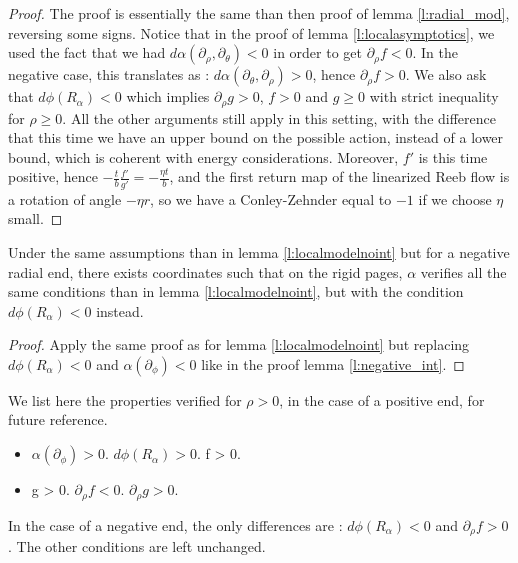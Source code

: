 \documentclass[../main.tex]{subfiles}
\begin{document}
\begin{proof}
The proof is essentially the same than then proof of lemma \ref{l:radial_mod}, reversing some signs. Notice that in the proof of lemma \ref{l:localasymptotics}, we used the fact that we had $d\alpha(\partial_\rho,\partial_\theta)< 0$ in order to get $\partial_\rho f < 0$. In the negative case, this translates as : $d\alpha(\partial_\theta,\partial_\rho)> 0$, hence $\partial_\rho f > 0$. We also ask that $d\phi(R_\alpha) < 0$ which implies $\partial_\rho g > 0$, $f> 0$ and $g\geq 0$ with strict inequality for $\rho \geq 0$. All the other arguments still apply in this setting, with the difference that this time we have an upper bound on the possible action, instead of a lower bound, which is coherent with energy considerations. Moreover, $f'$ is this time positive, hence $-\frac{t}{b}\frac{f'}{g'} = -\frac{\eta t}{b}$, and the first return map of the linearized Reeb flow is a rotation of angle $-\eta r$, so we have a Conley-Zehnder equal to $-1$ if we choose $\eta$ small.
\end{proof}

\begin{lemma}\label{l:negative_exact}
Under the same assumptions than in lemma \ref{l:localmodelnoint} but for a negative radial end, there exists coordinates such that on the rigid pages, $\alpha$ verifies all the same conditions than in lemma \ref{l:localmodelnoint}, but with the condition $d\phi(R_\alpha) < 0$ instead.
\end{lemma}


\begin{proof}
Apply the same proof as for lemma \ref{l:localmodelnoint} but replacing $d\phi(R_\alpha) < 0$ and $\alpha(\partial_\phi) < 0$ like in the proof lemma \ref{l:negative_int}.
\end{proof}

\begin{remark}\label{r:list_negative}
We list here the properties verified for $\rho> 0$, in the case of a positive end, for future reference.
\begin{itemize}
    \item $\alpha(\partial_\phi) > 0$. \inlineitem $d\phi(R_\alpha) > 0$. \inlineitem f > 0.
    \item g > 0\hspace{0.65cm}. \inlineitem $\partial_\rho f < 0$.\hspace{0.6cm} \inlineitem $\partial_\rho g > 0$.
\end{itemize}
In the case of a negative end, the only differences are : $d\phi(R_\alpha) < 0$ and $\partial_\rho f > 0$. The other conditions are left unchanged.
\end{remark}
\end{document}
